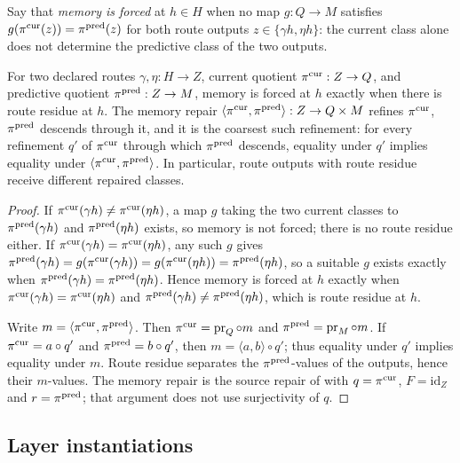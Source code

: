 Say that \emph{memory is forced} at \(h\in H\) when no map
\(g:Q\to M\) satisfies \(g(\pi^{\mathrm{cur}}(z))=\pi^{\mathrm{pred}}(z)\) for both route outputs
\(z\in\{\gamma h,\eta h\}\): the current class alone does not determine the
predictive class of the two outputs.

\begin{theorem}\label{thm:F3}
For two declared routes \(\gamma,\eta:H\to Z\), current quotient
\(\pi^{\mathrm{cur}}:Z\to Q\), and predictive quotient \(\pi^{\mathrm{pred}}:Z\to M\), memory is forced
at \(h\) exactly when there is route residue at \(h\). The memory repair
\(\langle\pi^{\mathrm{cur}},\pi^{\mathrm{pred}}\rangle:Z\to Q\times M\) refines \(\pi^{\mathrm{cur}}\),
\(\pi^{\mathrm{pred}}\) descends through it, and it is the coarsest such refinement:
for every refinement \(q'\) of \(\pi^{\mathrm{cur}}\) through which \(\pi^{\mathrm{pred}}\) descends,
equality under \(q'\) implies equality under \(\langle\pi^{\mathrm{cur}},\pi^{\mathrm{pred}}\rangle\).
In particular, route outputs with route residue receive different
repaired classes.
\end{theorem}

\begin{proof}
If \(\pi^{\mathrm{cur}}(\gamma h)\ne\pi^{\mathrm{cur}}(\eta h)\), a map \(g\) taking the two current
classes to \(\pi^{\mathrm{pred}}(\gamma h)\) and \(\pi^{\mathrm{pred}}(\eta h)\) exists, so memory is
not forced; there is no route residue either. If
\(\pi^{\mathrm{cur}}(\gamma h)=\pi^{\mathrm{cur}}(\eta h)\), any such \(g\) gives
\(\pi^{\mathrm{pred}}(\gamma h)=g(\pi^{\mathrm{cur}}(\gamma h))=g(\pi^{\mathrm{cur}}(\eta h))=\pi^{\mathrm{pred}}(\eta h)\), so a
suitable \(g\) exists exactly when \(\pi^{\mathrm{pred}}(\gamma h)=\pi^{\mathrm{pred}}(\eta h)\). Hence
memory is forced at \(h\) exactly when \(\pi^{\mathrm{cur}}(\gamma h)=\pi^{\mathrm{cur}}(\eta h)\) and
\(\pi^{\mathrm{pred}}(\gamma h)\ne\pi^{\mathrm{pred}}(\eta h)\), which is route residue at \(h\).

Write \(m=\langle\pi^{\mathrm{cur}},\pi^{\mathrm{pred}}\rangle\). Then \(\pi^{\mathrm{cur}}=\operatorname{pr}_Q\circ m\)
and \(\pi^{\mathrm{pred}}=\operatorname{pr}_M\circ m\). If \(\pi^{\mathrm{cur}}=a\circ q'\) and
\(\pi^{\mathrm{pred}}=b\circ q'\), then \(m=\langle a,b\rangle\circ q'\); thus equality under
\(q'\) implies equality under \(m\). Route residue separates the
\(\pi^{\mathrm{pred}}\)-values of the outputs, hence their \(m\)-values.
The memory repair is the source repair of  with \(q=\pi^{\mathrm{cur}}\), \(F=\mathrm{id}_Z\) and \(r=\pi^{\mathrm{pred}}\); that argument does not use surjectivity of \(q\).
\end{proof}

\subsection*{Layer instantiations}\label{layer-inst:F3}

